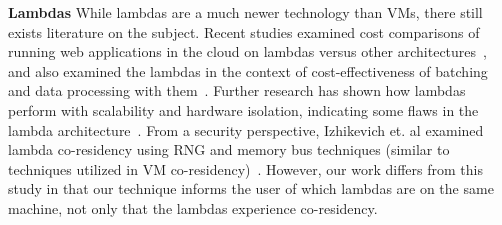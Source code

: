 \noindent \textbf{Lambdas} 
While lambdas are a much newer technology than VMs, there still exists literature
on the subject. Recent studies examined cost comparisons of running web
applications in the cloud on lambdas versus other
architectures~\cite{villamizar2016}, and also examined the lambdas 
in the context of cost-effectiveness of batching and data processing with
them~\cite{kiran2015}. Further research has shown how lambdas perform with
scalability and hardware isolation, indicating some flaws in the lambda
architecture~\cite{wangusenix2018}. From a security perspective, Izhikevich et.
al examined lambda co-residency using RNG and memory bus techniques (similar to
techniques utilized in VM co-residency)~\cite{izhikevich2018}. However, our work
differs from this study in that our technique informs the user of which lambdas
are on the same machine, not only that the lambdas experience co-residency.
